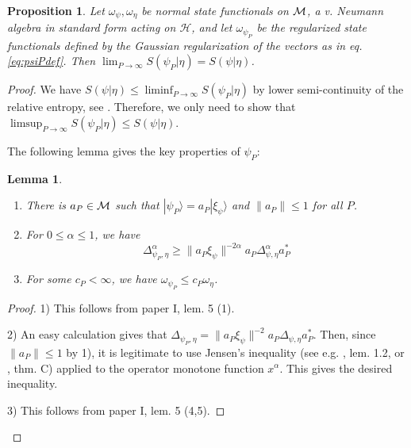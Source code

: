 \documentclass[english,a4paper,12pt]{article}
\newtheorem{proposition}{Proposition}
\newtheorem{lemma}{Lemma}
\def\sH{\mathscr{H}}
\def\cM{{\mathfrak M}}
\newcommand{\ca}[1]{{\cal #1}}
\newcommand{\ben}{\begin{equation}}
\newcommand{\een}{\end{equation}}
\def\cM{{\ca M}}
\begin{document}
\begin{proposition}\label{prop:1}
Let $\omega_\psi, \omega_\eta$ be normal state functionals on $\cM$, a v. Neumann algebra in standard form acting on $\sH$, and let $\omega_{\psi_P}$ be the regularized state functionals defined by the Gaussian regularization of the vectors as in eq. \eqref{eq:psiPdef}. Then $\lim_{P \to \infty} S(\psi_{P} | \eta) = S( \psi | \eta)$.
\end{proposition}
\begin{proof}
We have
$
S(\psi | \eta) \le \liminf_{P \to \infty} S(\psi_{P} | \eta)
$
by lower semi-continuity of the relative entropy, see \cite{Araki2}. Therefore, we only need to show that 
$\limsup_{P \to \infty} S(\psi_{P} | \eta) \le S( \psi | \eta)$. 

The following lemma gives the key properties of $\psi_P$:
\begin{lemma}\label{lem:3}
\begin{enumerate}
\item There is $a_P \in \cM$ such that $|\psi_P\rangle = a_P |\xi_\psi\rangle$ and
$\| a_P\| \le 1$ for all $P$.
\item For $0 \le \alpha \le 1$, we have 
\ben
\Delta_{\psi_P,\eta}^{\alpha} \ge \| a_P \xi_\psi \|^{-2\alpha}  a_P \Delta_{\psi,\eta}^{\alpha} a_P^*
\een
\item For some $c_P<\infty$, we have $\omega_{\psi_P} \le c_P\omega_\eta$. 
\end{enumerate}
\end{lemma}
\begin{proof}
1) This follows from paper I, lem. 5 (1). 

2) An easy calculation gives that $\Delta_{\psi_P,\eta} = \| a_P \xi_\psi \|^{-2}  a_P \Delta_{\psi,\eta} a_P^*$. 
Then, since $\|a_P\|\le 1$ by 1), it is legitimate to use Jensen's inequality (see e.g. \cite{Petz1993}, lem. 1.2, or \cite{Petz4}, thm. C)  
applied to the operator monotone function $x^\alpha$. This gives the desired inequality.

3) This follows from paper I, lem. 5 (4,5).
\end{proof}


\end{proof}
\end{document}
